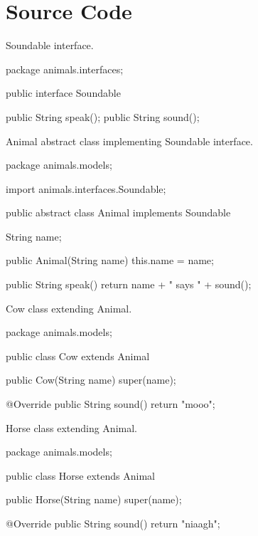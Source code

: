 \chapter{Source Code}
\label{app:SourceCode}


\begin{program}[hbt!]
    \caption{ Soundable interface. }
    \label{appendix:soundable}
    \begin{JavaCode}
package animals.interfaces;

public interface Soundable {
	
	public String speak();
	public String sound();
}  \end{JavaCode}
\end{program}


\begin{program}[hbt!]
    \caption{ Animal abstract class implementing Soundable interface. }
    \label{appendix:animal}
    \begin{JavaCode}
package animals.models;

import animals.interfaces.Soundable;

public abstract class Animal implements Soundable {

	String name;
	
	public Animal(String name) {
		this.name = name;
	}
	
	public String speak() {
		return name + " says " + sound();
	}
	
}  \end{JavaCode}
\end{program}

\begin{program}[hbt!]
    \caption{ Cow class extending Animal. }
    \label{appendix:cow}
    \begin{JavaCode}
package animals.models;

public class Cow extends Animal {

	public Cow(String name) {
		super(name);
	}
	
	@Override
	public String sound() {
		return "mooo";
	}

}  \end{JavaCode}
\end{program}


\begin{program}[hbt!]
    \caption{ Horse class extending Animal. }
    \label{appendix:horse}
    \begin{JavaCode}
package animals.models;

public class Horse extends Animal {

	public Horse(String name) {
		super(name);
	}
	
	@Override
	public String sound() {
		return "niaagh";
	}

}  \end{JavaCode}
\end{program}


